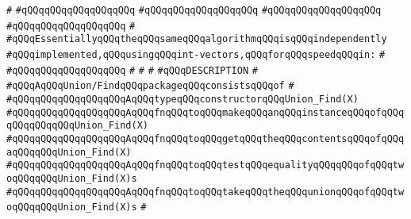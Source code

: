 \verb|#|\newline
\verb|#qQQqqQQqqQQqqQQqqQQq|\newline
\verb|#qQQqqQQqqQQqqQQqqQQq|\newline
\verb|#qQQqqQQqqQQqqQQqqQQq|\newline
\verb|#qQQqqQQqqQQqqQQqqQQq|\newline
\verb|#|\newline
\verb|#qQQqEssentiallyqQQqtheqQQqsameqQQqalgorithmqQQqisqQQqindependently|\newline
\verb|#qQQqimplemented,qQQqusingqQQqint-vectors,qQQqforqQQqspeedqQQqin:|\newline
\verb|#|\newline
\verb|#qQQqqQQqqQQqqQQqqQQq|\newline
\verb|#|\newline
\verb|#|\newline
\verb|#|\newline
\verb|#qQQqDESCRIPTION|\newline
\verb|#|\newline
\verb|#qQQqAqQQqUnion/FindqQQqpackageqQQqconsistsqQQqof|\newline
\verb|#|\newline
\verb|#qQQqqQQqqQQqqQQqqQQqAqQQqtypeqQQqconstructorqQQqUnion_Find(X)|\newline
\verb|#qQQqqQQqqQQqqQQqqQQqAqQQqfnqQQqtoqQQqmakeqQQqanqQQqinstanceqQQqofqQQqqQQqqQQqqQQqUnion_Find(X)|\newline
\verb|#qQQqqQQqqQQqqQQqqQQqAqQQqfnqQQqtoqQQqgetqQQqtheqQQqcontentsqQQqofqQQqaqQQqqQQqUnion_Find(X)|\newline
\verb|#qQQqqQQqqQQqqQQqqQQqAqQQqfnqQQqtoqQQqtestqQQqequalityqQQqqQQqofqQQqtwoqQQqqQQqUnion_Find(X)s|\newline
\verb|#qQQqqQQqqQQqqQQqqQQqAqQQqfnqQQqtoqQQqtakeqQQqtheqQQqunionqQQqofqQQqtwoqQQqqQQqUnion_Find(X)s|\newline
\verb|#|\newline
